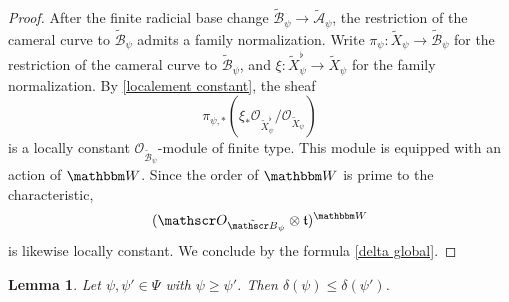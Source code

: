 \documentclass[12pt,english]{smfart}
\numberwithin{equation}{subsection}
\newtheorem{lemma}[equation]{Lemma}
\theoremstyle{remark}
\newcommand\calA{{\mathscr A}}
\newcommand\calB{{\mathscr B}}
\newcommand\calO{{\mathscr O}}
\newcommand\frakt{{\mathfrak t}}
\newcommand\bbW{{\mathbbm W}}
\begin{document}
\begin{proof}
After the finite radicial base change $\tilde\calB_\psi\rightarrow\tilde\calA_\psi$, the restriction of the cameral curve to $\tilde\calB_\psi$ admits a family normalization. Write $\pi_\psi:\widetilde X_\psi\rightarrow\tilde\calB_\psi$ for the restriction of the cameral curve to $\tilde\calB_\psi$, and $\xi:\widetilde X_\psi^\flat\rightarrow\widetilde X_\psi$ for the family normalization. By \ref{localement constant}, the sheaf
$$\pi_{\psi,*}(\xi_*\calO_{\widetilde X_\psi^\flat}/\calO_{\widetilde X_\psi})$$
is a locally constant $\calO_{\tilde\calB_\psi}$-module of finite type. This module is equipped with an action of $\bbW$. Since the order of $\bbW$ is prime to the characteristic,
$$(\calO_{\tilde\calB_\psi}\otimes\frakt)^\bbW$$
is likewise locally constant. We conclude by the formula \ref{delta global}.
\end{proof}

\begin{lemma}\label{delta decroit}
Let $\psi,\psi'\in \Psi$ with $\psi\geq \psi'$. Then $\delta(\psi)\leq \delta(\psi')$.
\end{lemma}
\end{document}
